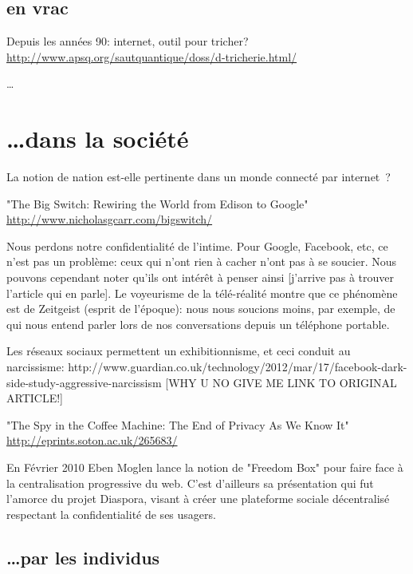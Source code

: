 \subsection{en vrac}



Depuis les années 90: internet, outil pour tricher?
\url{http://www.apsq.org/sautquantique/doss/d-tricherie.html/}

\ldots

\section{\ldots dans la société}

La notion de nation est-elle pertinente dans un monde connecté par
internet~?

"The Big Switch: Rewiring the World from Edison to Google" 
 \url{http://www.nicholasgcarr.com/bigswitch/}

Nous perdons notre confidentialité de l'intime. Pour Google, Facebook, etc, 
ce n'est pas un problème: ceux qui n'ont rien à cacher n'ont pas à se soucier. Nous
pouvons cependant noter qu'ils ont intérêt à penser ainsi [j'arrive pas à 
trouver l'article qui en parle]. Le voyeurisme de la télé-réalité montre 
que ce phénomène est de Zeitgeist (esprit de l'époque): nous nous soucions 
moins, par exemple, de qui nous entend parler lors de nos
conversations depuis un téléphone portable.

Les réseaux sociaux permettent un exhibitionnisme, et ceci conduit au 
narcissisme:
http://www.guardian.co.uk/technology/2012/mar/17/facebook-dark-side-study-aggressive-narcissism 
[WHY U NO GIVE ME LINK TO ORIGINAL ARTICLE!]

"The Spy in the Coffee Machine: The End of Privacy As We Know It"
 \url{http://eprints.soton.ac.uk/265683/}

En Février 2010 Eben Moglen lance la notion de "Freedom Box" pour faire face à
la centralisation progressive du web. C'est d'ailleurs sa présentation qui fut
l'amorce du projet Diaspora, visant à créer une plateforme sociale décentralisé 
respectant la confidentialité de ses usagers. 

\subsection{\ldots par les individus}


